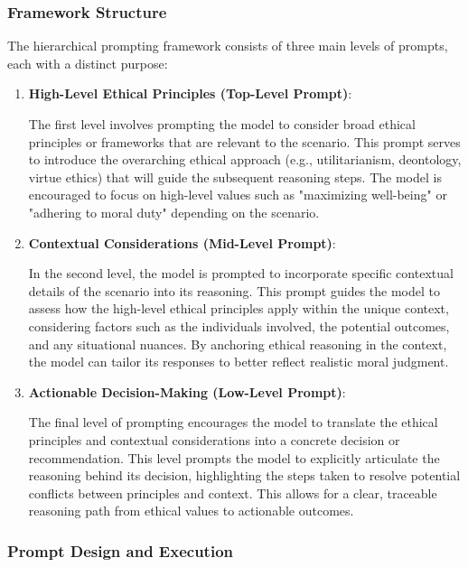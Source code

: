 \documentclass{article}
\begin{document}
\subsubsection{Framework Structure}

The hierarchical prompting framework consists of three main levels of prompts, each with a distinct purpose:
\begin{enumerate}
    \item \textbf{High-Level Ethical Principles (Top-Level Prompt)}:
    
    The first level involves prompting the model to consider broad ethical principles or frameworks that are relevant to the scenario. This prompt serves to introduce the overarching ethical approach (e.g., utilitarianism, deontology, virtue ethics) that will guide the subsequent reasoning steps. The model is encouraged to focus on high-level values such as "maximizing well-being" or "adhering to moral duty" depending on the scenario.
    
    \item \textbf{Contextual Considerations (Mid-Level Prompt)}:
    
    In the second level, the model is prompted to incorporate specific contextual details of the scenario into its reasoning. This prompt guides the model to assess how the high-level ethical principles apply within the unique context, considering factors such as the individuals involved, the potential outcomes, and any situational nuances. By anchoring ethical reasoning in the context, the model can tailor its responses to better reflect realistic moral judgment.
    
    \item \textbf{Actionable Decision-Making (Low-Level Prompt)}:
    
    The final level of prompting encourages the model to translate the ethical principles and contextual considerations into a concrete decision or recommendation. This level prompts the model to explicitly articulate the reasoning behind its decision, highlighting the steps taken to resolve potential conflicts between principles and context. This allows for a clear, traceable reasoning path from ethical values to actionable outcomes.
\end{enumerate}

\subsubsection{Prompt Design and Execution}
\end{document}
